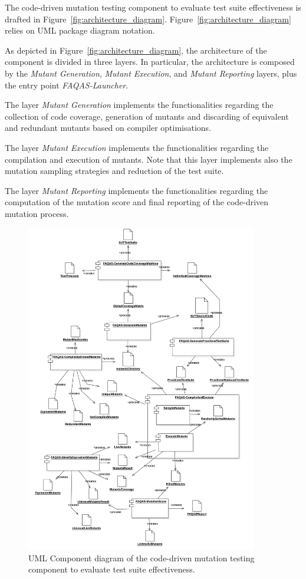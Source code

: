 The code-driven mutation testing component to evaluate test suite effectiveness is drafted in Figure~\ref{fig:architecture_diagram}.
Figure~\ref{fig:architecture_diagram} relies on UML package diagram notation. 

As depicted in Figure~\ref{fig:architecture_diagram}, the architecture of the component is divided in three layers. In particular, the architecture is composed by the \textit{Mutant Generation}, \textit{Mutant Execution}, and \textit{Mutant Reporting} layers, plus the entry point \textit{FAQAS-Launcher}. 

The layer \textit{Mutant Generation} implements the functionalities regarding the collection of code coverage, generation of mutants and discarding of equivalent and redundant mutants based on compiler optimisations.

The layer \textit{Mutant Execution} implements the functionalities regarding the compilation and execution of mutants. Note that this layer implements also the mutation sampling strategies and reduction of the test suite.

The layer \textit{Mutant Reporting} implements the functionalities regarding the computation of the mutation score and final reporting of the code-driven mutation process.

\begin{figure}[h]
  \centering
	\includegraphics[width=0.9\textwidth]{images/component.png}
      \caption{UML Component diagram of the code-driven mutation testing component to evaluate test suite effectiveness.}
      \label{fig:component_diagram}
\end{figure}

